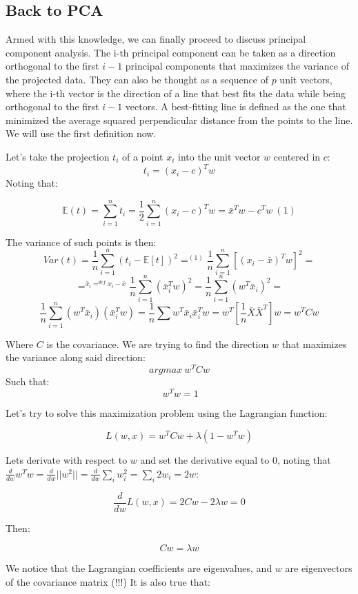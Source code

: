 \documentclass[11pt]{article}
\begin{document}
\subsection{Back to PCA}\label{back-to-pca}

Armed with this knowledge, we can finally proceed to discuss principal
component analysis. The i-th principal component can be taken as a
direction orthogonal to the first \(i-1\) principal components that
maximizes the variance of the projected data. They can also be thought
as a sequence of \(p\) unit vectors, where the i-th vector is the
direction of a line that best fits the data while being orthogonal to
the first \(i-1\) vectors. A best-fitting line is defined as the one
that minimized the average squared perpendicular distance from the
points to the line. We will use the first definition now.

Let's take the projection \(t_i\) of a point \(x_i\) into the unit
vector \(w\) centered in \(c\): \[t_i = (x_i-c)^Tw \] Noting that:

\[\mathbb{E}(t)= \sum_{i=1}^nt_i = \frac{1}{2}\sum_{i=1}^n (x_i -c)^Tw = \bar{x}^Tw - c^Tw\ (1)\]

The variance of such points is then:
\[Var(t)=\frac{1}{n}\sum_{i=1}^n (t_i - \mathbb{E}[t])^2 =^{(1)} \frac{1}{n}\sum_{i=1}^n [(x_i - \bar x )^T w]^2 = \]
\[ =^{\bar x_i =^{def}x_i - \bar x} \frac{1}{n}\sum_{i=1}^n (\bar x_i^T w)^2 =  \frac{1}{n} \sum_{i=1}^n (w^T\bar{x}_i)^2 = \]
\[ \frac{1}{n} \sum_{i=1}^n (w^T\bar{x}_i)(\bar{x}_i^Tw) = \frac{1}{n} \sum{w^T}{\bar{x}_i\bar{x}_i^T w} = w^T[\frac{1}{n}\bar X \bar X^T]w = w^TCw\]

Where \(C\) is the covariance. We are trying to find the direction \(w\)
that maximizes the variance along said direction: \[argmax\ w^T C w\]
Such that: \[\ w^Tw=1\]

Let's try to solve this maximization problem using the Lagrangian
function:

\[L(w, x)=w^TCw+\lambda (1-w^Tw)\]

Lets derivate with respect to \(w\) and set the derivative equal to
\(0\), noting that
\(\frac{d}{dw}w^Tw=\frac{d}{dw}||w^2||=\frac{d}{dw}\sum_{i}w_i^2=\sum_{i}2w_i=2w\):

\[\frac{d}{dw}L(w, x)=2Cw-2\lambda w=0\]

Then:

\[Cw=\lambda w\]

We notice that the Lagrangian coefficients are eigenvalues, and \(w\)
are eigenvectors of the covariance matrix (!!!) It is also true that:
\end{document}
